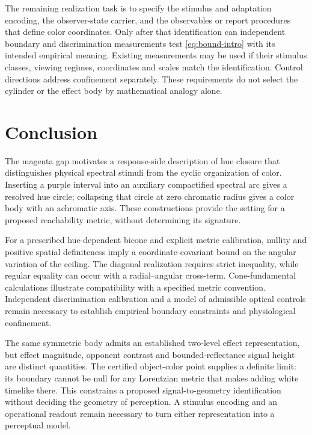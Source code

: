 \documentclass[9pt,twocolumn,twoside]{opticajnl}
\theoremstyle{plain}
\begin{document}
The remaining realization task is to specify the stimulus and adaptation encoding, the observer-state carrier, and the observables or report procedures that define color coordinates. Only after that identification can independent boundary and discrimination measurements test \eqref{eq:bound-intro} with its intended empirical meaning. Existing measurements may be used if their stimulus classes, viewing regimes, coordinates and scales match the identification. Control directions address confinement separately. These requirements do not select the cylinder or the effect body by mathematical analogy alone.

\section{Conclusion}
The magenta gap motivates a response-side description of hue closure that distinguishes physical spectral stimuli from the cyclic organization of color. Inserting a purple interval into an auxiliary compactified spectral arc gives a resolved hue circle; collapsing that circle at zero chromatic radius gives a color body with an achromatic axis. These constructions provide the setting for a proposed reachability metric, without determining its signature.

For a prescribed hue-dependent bicone and explicit metric calibration, nullity and positive spatial definiteness imply a coordinate-covariant bound on the angular variation of the ceiling. The diagonal realization requires strict inequality, while regular equality can occur with a radial--angular cross-term. Cone-fundamental calculations illustrate compatibility with a specified metric convention. Independent discrimination calibration and a model of admissible optical controls remain necessary to establish empirical boundary constraints and physiological confinement.

The same symmetric body admits an established two-level effect representation, but effect magnitude, opponent contrast and bounded-reflectance signal height are distinct quantities. The certified object-color point supplies a definite limit: its boundary cannot be null for any Lorentzian metric that makes adding white timelike there. This constrains a proposed signal-to-geometry identification without deciding the geometry of perception. A stimulus encoding and an operational readout remain necessary to turn either representation into a perceptual model.

\appendix
\end{document}
